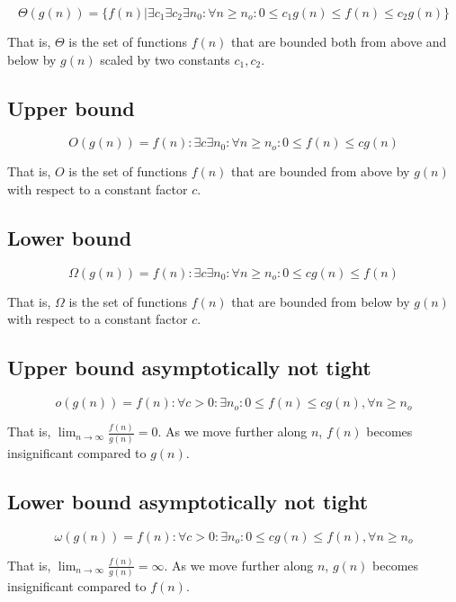 \[
    \Theta\left(g\left(n\right)\right)= \{f(n) | \exists c_1 \exists c_2 \exists n_0: \forall n \ge n_o: 0 \le c_1 g(n) \le f(n) \le c_2 g(n) \}
\]

That is, $\Theta$ is the set of functions $f(n)$ that are bounded both from above and below by $g(n)$ scaled by two constants $c_1, c_2$.

\subsection{Upper bound}

\[
    O\left(g\left(n\right)\right)={f(n): \exists c \exists n_0: \forall n \ge n_o: 0 \le  f(n) \le c g(n)}
\]

That is, $O$ is the set of functions $f(n)$ that are bounded from above by $g(n)$ with respect to a constant factor $c$.

\subsection{Lower bound}

\[
    \Omega\left(g\left(n\right)\right)={f(n): \exists c \exists n_0: \forall n \ge n_o: 0  \le c g(n) \le  f(n)}
\]

That is, $\Omega$ is the set of functions $f(n)$ that are bounded from below by $g(n)$ with respect to a constant factor $c$.

\subsection{Upper bound asymptotically not tight}

\[
    o(g(n)) = f(n): \forall c > 0: \exists n_o: 0 \le f(n) \le cg(n), \forall n \ge n_o
\]

That is, $\lim_{n\rightarrow\infty}\frac{f(n)}{g(n)}=0$.
As we move further along $n$, $f(n)$ becomes insignificant compared to $g(n)$. 

\subsection{Lower bound asymptotically not tight}

\[
    \omega(g(n)) = f(n): \forall c > 0: \exists n_o: 0  \le cg(n)\le f(n), \forall n \ge n_o
\]

That is, $\lim_{n\rightarrow\infty}\frac{f(n)}{g(n)}=\infty$.
As we move further along $n$, $g(n)$ becomes insignificant compared to $f(n)$.

